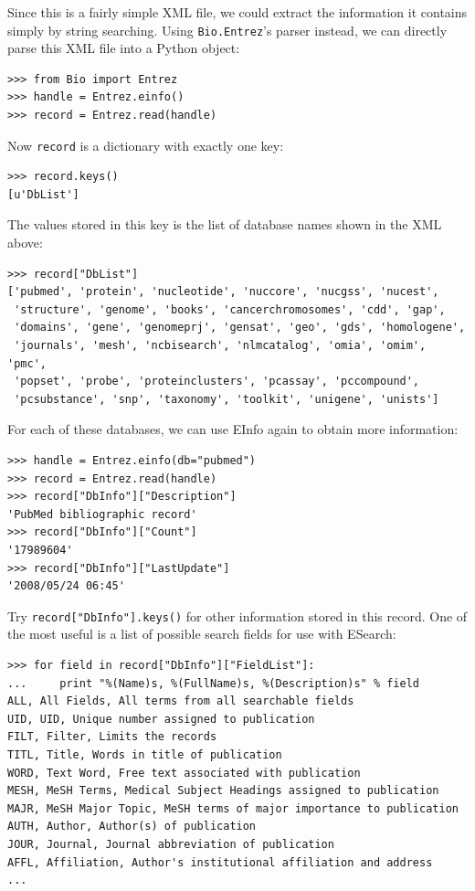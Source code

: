 \documentclass{report}
\begin{document}
Since this is a fairly simple XML file, we could extract the information it contains simply by string searching. Using \verb+Bio.Entrez+'s parser instead, we can directly parse this XML file into a Python object:
\begin{verbatim}
>>> from Bio import Entrez
>>> handle = Entrez.einfo()
>>> record = Entrez.read(handle)
\end{verbatim}
Now \verb+record+ is a dictionary with exactly one key:
\begin{verbatim}
>>> record.keys()
[u'DbList']
\end{verbatim}
The values stored in this key is the list of database names shown in the XML above:
\begin{verbatim}
>>> record["DbList"]
['pubmed', 'protein', 'nucleotide', 'nuccore', 'nucgss', 'nucest',
 'structure', 'genome', 'books', 'cancerchromosomes', 'cdd', 'gap',
 'domains', 'gene', 'genomeprj', 'gensat', 'geo', 'gds', 'homologene',
 'journals', 'mesh', 'ncbisearch', 'nlmcatalog', 'omia', 'omim', 'pmc',
 'popset', 'probe', 'proteinclusters', 'pcassay', 'pccompound',
 'pcsubstance', 'snp', 'taxonomy', 'toolkit', 'unigene', 'unists']
\end{verbatim}

For each of these databases, we can use EInfo again to obtain more information:
\begin{verbatim}
>>> handle = Entrez.einfo(db="pubmed")
>>> record = Entrez.read(handle)
>>> record["DbInfo"]["Description"]
'PubMed bibliographic record'
>>> record["DbInfo"]["Count"]
'17989604'
>>> record["DbInfo"]["LastUpdate"]
'2008/05/24 06:45'
\end{verbatim}
Try \verb+record["DbInfo"].keys()+ for other information stored in this record.
One of the most useful is a list of possible search fields for use with ESearch:

\begin{verbatim}
>>> for field in record["DbInfo"]["FieldList"]:
...     print "%(Name)s, %(FullName)s, %(Description)s" % field
ALL, All Fields, All terms from all searchable fields
UID, UID, Unique number assigned to publication
FILT, Filter, Limits the records
TITL, Title, Words in title of publication
WORD, Text Word, Free text associated with publication
MESH, MeSH Terms, Medical Subject Headings assigned to publication
MAJR, MeSH Major Topic, MeSH terms of major importance to publication
AUTH, Author, Author(s) of publication
JOUR, Journal, Journal abbreviation of publication
AFFL, Affiliation, Author's institutional affiliation and address
...
\end{verbatim}
\end{document}
